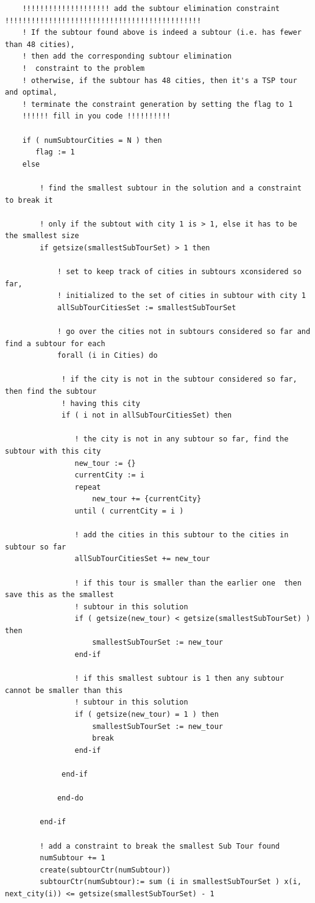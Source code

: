 \documentclass[twoside,12pt]{article}
\begin{document}
\begin{verbatim}
	!!!!!!!!!!!!!!!!!!!! add the subtour elimination constraint !!!!!!!!!!!!!!!!!!!!!!!!!!!!!!!!!!!!!!!!!!!!!
	! If the subtour found above is indeed a subtour (i.e. has fewer than 48 cities), 
	! then add the corresponding subtour elimination
	!  constraint to the problem
	! otherwise, if the subtour has 48 cities, then it's a TSP tour and optimal, 
	! terminate the constraint generation by setting the flag to 1
	!!!!!! fill in you code !!!!!!!!!!
	
	if ( numSubtourCities = N ) then
	   flag := 1
	else

		! find the smallest subtour in the solution and a constraint to break it
			
		! only if the subtout with city 1 is > 1, else it has to be the smallest size
		if getsize(smallestSubTourSet) > 1 then
			
			! set to keep track of cities in subtours xconsidered so far,
			! initialized to the set of cities in subtour with city 1
			allSubTourCitiesSet := smallestSubTourSet
			
			! go over the cities not in subtours considered so far and find a subtour for each
			forall (i in Cities) do
			
			 ! if the city is not in the subtour considered so far, then find the subtour
			 ! having this city
			 if ( i not in allSubTourCitiesSet) then
				
				! the city is not in any subtour so far, find the subtour with this city
				new_tour := {}
				currentCity := i
				repeat
					new_tour += {currentCity}
				until ( currentCity = i ) 
				
				! add the cities in this subtour to the cities in subtour so far
				allSubTourCitiesSet += new_tour
				
				! if this tour is smaller than the earlier one  then save this as the smallest
				! subtour in this solution
				if ( getsize(new_tour) < getsize(smallestSubTourSet) ) then
					smallestSubTourSet := new_tour
				end-if
				
				! if this smallest subtour is 1 then any subtour cannot be smaller than this
				! subtour in this solution
				if ( getsize(new_tour) = 1 ) then
					smallestSubTourSet := new_tour
					break
				end-if
			 
			 end-if
			 
			end-do
			
		end-if
		
		! add a constraint to break the smallest Sub Tour found 
		numSubtour += 1
		create(subtourCtr(numSubtour))
		subtourCtr(numSubtour):= sum (i in smallestSubTourSet ) x(i, next_city(i)) <= getsize(smallestSubTourSet) - 1


\end{verbatim}
\end{document}

